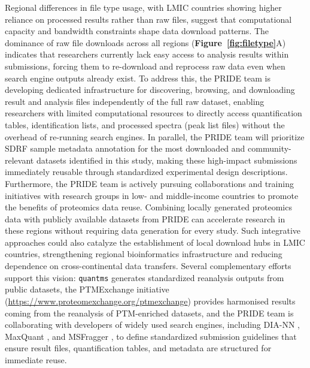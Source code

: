 \documentclass[11pt,a4paper]{article}
\begin{document}
\begin{sloppypar}
Regional differences in file type usage, with LMIC countries showing higher reliance on processed results rather than raw files, suggest that computational capacity and bandwidth constraints shape data download patterns. The dominance of raw file downloads across all regions (\textbf{Figure~\ref{fig:filetype}}A) indicates that researchers currently lack easy access to analysis results within submissions, forcing them to re-download and reprocess raw data even when search engine outputs already exist. To address this, the PRIDE team is developing dedicated infrastructure for discovering, browsing, and downloading result and analysis files independently of the full raw dataset, enabling researchers with limited computational resources to directly access quantification tables, identification lists, and processed spectra (peak list files) without the overhead of re-running search engines. In parallel, the PRIDE team will prioritize SDRF sample metadata annotation \citep{Dai2021} for the most downloaded and community-relevant datasets identified in this study, making these high-impact submissions immediately reusable through standardized experimental design descriptions. Furthermore, the PRIDE team is actively pursuing collaborations and training initiatives with research groups in low- and middle-income countries to promote the benefits of proteomics data reuse. Combining locally generated proteomics data with publicly available datasets from PRIDE can accelerate research in these regions without requiring data generation for every study. Such integrative approaches could also catalyze the establishment of local download hubs in LMIC countries, strengthening regional bioinformatics infrastructure and reducing dependence on cross-continental data transfers. Several complementary efforts support this vision: \texttt{quantms} \citep{Dai2024} generates standardized reanalysis outputs from public datasets, the PTMExchange initiative (\url{https://www.proteomexchange.org/ptmexchange}) provides harmonised results coming from the reanalysis of PTM-enriched datasets, and the PRIDE team is collaborating with developers of widely used search engines, including DIA-NN \citep{Demichev2020}, MaxQuant \citep{Cox2008}, and MSFragger \citep{Kong2017}, to define standardized submission guidelines that ensure result files, quantification tables, and metadata are structured for immediate reuse.


\end{sloppypar}
\end{document}
